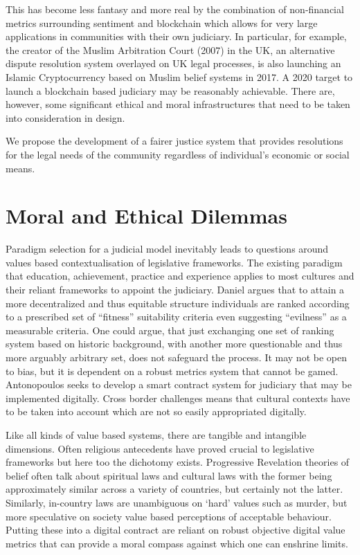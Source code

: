 \documentclass[twoside,twocolumn]{article}
\begin{document}
This has become less fantasy and more real by the combination of non-financial
metrics surrounding sentiment and blockchain\cite{Taghiyeva2016} which
allows for very large applications in communities with their own judiciary. In
particular, for example, the creator of the Muslim Arbitration Court (2007) in
the UK, an alternative dispute resolution system overlayed on UK legal
processes, is also launching an Islamic Cryptocurrency based on Muslim belief
systems in 2017\cite{Taeed2016}. A 2020 target to launch a blockchain based
judiciary may be reasonably achievable. There are, however, some significant
ethical and moral infrastructures that need to be taken into consideration in
design.

We propose the development of a fairer justice system that provides resolutions
for the legal needs of the community regardless of individual's economic or
social means\cite{nla.cat-vn632475}.

\section{Moral and Ethical Dilemmas}
Paradigm selection for a judicial model inevitably leads to questions around
values based contextualisation of legislative frameworks. The existing paradigm
that education, achievement, practice and experience applies to most cultures
and their reliant frameworks to appoint the judiciary.
Daniel\cite{DanielDAGS2016} argues that to attain a more decentralized and thus
equitable structure individuals are ranked according to a prescribed set of
“fitness” suitability criteria even suggesting “evilness” as a measurable
criteria. One could argue, that just exchanging one set of ranking system based
on historic background, with another more questionable and thus more arguably
arbitrary set, does not safeguard the process. It may not be open to bias, but
it is dependent on a robust metrics system that cannot be gamed.
Antonopoulos\cite{AntonopoulosDAMN2016} seeks to develop a smart contract system
for judiciary that may be implemented digitally. Cross border challenges means
that cultural contexts have to be taken into account which are not so easily
appropriated digitally.

Like all kinds of value based systems, there are tangible and intangible
dimensions. Often religious antecedents have proved crucial to legislative
frameworks but here too the dichotomy exists. Progressive Revelation theories of
belief often talk about spiritual laws and cultural laws with the former being
approximately similar across a variety of countries, but certainly not the
latter. Similarly, in-country laws are unambiguous on ‘hard’ values such as
murder, but more speculative on society value based perceptions of acceptable
behaviour. Putting these into a digital contract are reliant on robust objective
digital value metrics that can provide a moral compass against which one can
enshrine limits.
\end{document}
